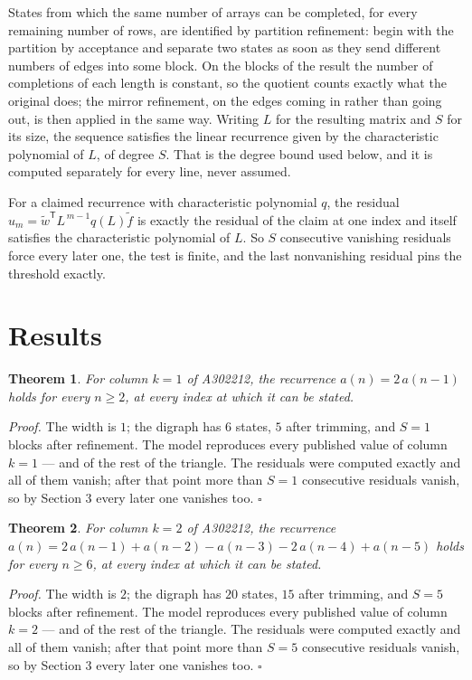 \documentclass[11pt]{article}
\newtheorem{theorem}{Theorem}
\theoremstyle{definition}
\begin{document}
States from which the same number of arrays can be completed, for every remaining number of rows, are identified by partition refinement: begin with the partition by acceptance and separate two states as soon as they send different numbers of edges into some block. On the blocks of the result the number of completions of each length is constant, so the quotient counts exactly what the original does; the mirror refinement, on the edges coming in rather than going out, is then applied in the same way. Writing $L$ for the resulting matrix and $S$ for its size, the sequence satisfies the linear recurrence given by the characteristic polynomial of $L$, of degree $S$. That is the degree bound used below, and it is computed separately for every line, never assumed.

For a claimed recurrence with characteristic polynomial $q$, the residual $u_m = \tilde w^{\mathsf T}L^{\,m-1}q(L)\tilde f$ is exactly the residual of the claim at one index and itself satisfies the characteristic polynomial of $L$. So $S$ consecutive vanishing residuals force every later one, the test is finite, and the last nonvanishing residual pins the threshold exactly.

\section{Results}

\begin{theorem} For column $k = 1$ of A302212, the recurrence $a(n) = 2\,a(n-1)$ holds for every $n \ge 2$, at every index at which it can be stated.\end{theorem}

{\itshape Proof.} The width is $1$; the digraph has $6$ states, $5$ after trimming, and $S = 1$ blocks after refinement. The model reproduces every published value of column $k = 1$ --- and of the rest of the triangle. The residuals were computed exactly and all of them vanish; after that point more than $S = 1$ consecutive residuals vanish, so by Section 3 every later one vanishes too. $\square$

\begin{theorem} For column $k = 2$ of A302212, the recurrence $a(n) = 2\,a(n-1) + a(n-2) - a(n-3) - 2\,a(n-4) + a(n-5)$ holds for every $n \ge 6$, at every index at which it can be stated.\end{theorem}

{\itshape Proof.} The width is $2$; the digraph has $20$ states, $15$ after trimming, and $S = 5$ blocks after refinement. The model reproduces every published value of column $k = 2$ --- and of the rest of the triangle. The residuals were computed exactly and all of them vanish; after that point more than $S = 5$ consecutive residuals vanish, so by Section 3 every later one vanishes too. $\square$
\end{document}
